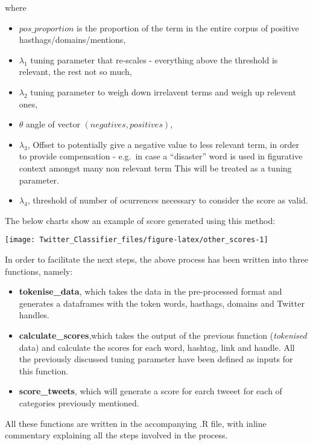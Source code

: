 \documentclass[11pt,]{article}
\providecommand{\tightlist}{%
  \setlength{\itemsep}{0pt}\setlength{\parskip}{0pt}}
\begin{document}
where

\begin{itemize}
\tightlist
\item
  \(pos\_proportion\) is the proportion of the term in the entire corpus
  of positive hasthags/domains/mentions,
\item
  \(\lambda_1\) tuning parameter that re-scales - everything above the
  threshold is relevant, the rest not so much,
\item
  \(\lambda_2\) tuning parameter to weigh down irrelavent terms and
  weigh up relevent ones,
\item
  \(\theta\) angle of vector \((negatives,positives)\),
\item
  \(\lambda_3\), Offset to potentially give a negative value to less
  relevant term, in order to provide compensation - e.g.~in case a
  ``disaster'' word is used in figurative context amongst many non
  relevant term This will be treated as a tuning parameter.
\item
  \(\lambda_4\), threshold of number of ocurrences necessary to consider
  the score as valid.
\end{itemize}

The below charts show an example of score generated using this method:

\begin{center}\texttt{[image: Twitter\_Classifier\_files/figure-latex/other\_scores-1]} \end{center}

In order to facilitate the next steps, the above process has been
written into three functions, namely:

\begin{itemize}
\tightlist
\item
  \textbf{tokenise\_data}, which takes the data in the pre-processed
  format and generates a dataframes with the token words, hasthags,
  domains and Twitter handles.
\item
  \textbf{calculate\_scores},which takes the output of the previous
  function (\emph{tokenised} data) and calculate the scores for each
  word, hashtag, link and handle. All the previously discussed tuning
  parameter have been defined as inputs for this function.
\item
  \textbf{score\_tweets}, which will generate a score for earch tweeet
  for each of categories previously mentioned.
\end{itemize}

All these functions are written in the accompanying .R file, with inline
commentary explaining all the steps involved in the process.
\end{document}
